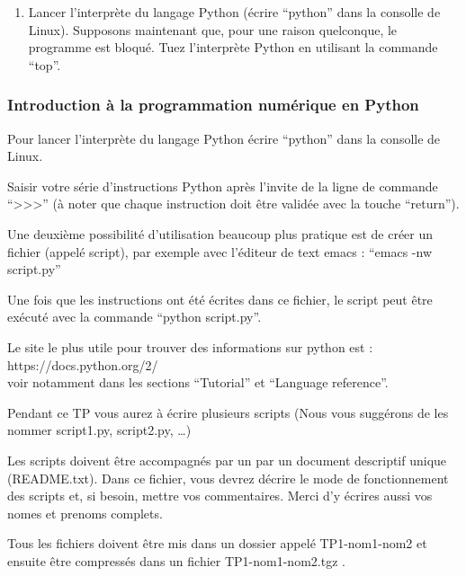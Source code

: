 \documentclass{article}
\begin{document}
    \begin{enumerate}
\def\labelenumi{\arabic{enumi})}
\setcounter{enumi}{6}
\itemsep1pt\parskip0pt
\item
  Lancer l'interprète du langage Python (écrire ``python'' dans la
  consolle de Linux). Supposons maintenant que, pour une raison
  quelconque, le programme est bloqué. Tuez l'interprète Python en
  utilisant la commande ``top''.
\end{enumerate}

    \subsubsection{Introduction à la programmation numérique en
Python}\label{introduction-uxe0-la-programmation-numuxe9rique-en-python}

    Pour lancer l'interprète du langage Python écrire ``python'' dans la
consolle de Linux.

Saisir votre série d'instructions Python après l'invite de la ligne de
commande ``\textgreater{}\textgreater{}\textgreater{}'' (à noter que
chaque instruction doit être validée avec la touche ``return'').

    Une deuxième possibilité d'utilisation beaucoup plus pratique est de
créer un fichier (appelé script), par exemple avec l'éditeur de text
emacs : ``emacs -nw script.py''

    Une fois que les instructions ont été écrites dans ce fichier, le script
peut être exécuté avec la commande ``python script.py''.

    

    Le site le plus utile pour trouver des informations sur python est :
https://docs.python.org/2/\\voir notamment dans les sections
``Tutorial'' et ``Language reference''.

    

    Pendant ce TP vous aurez à écrire plusieurs scripts (Nous vous suggérons
de les nommer script1.py, script2.py, \ldots{})

    Les scripts doivent être accompagnés par un par un document descriptif
unique (README.txt). Dans ce fichier, vous devrez décrire le mode de
fonctionnement des scripts et, si besoin, mettre vos commentaires. Merci
d'y écrires aussi vos nomes et prenoms complets.

    Tous les fichiers doivent être mis dans un dossier appelé TP1-nom1-nom2
et ensuite être compressés dans un fichier TP1-nom1-nom2.tgz .
\end{document}
